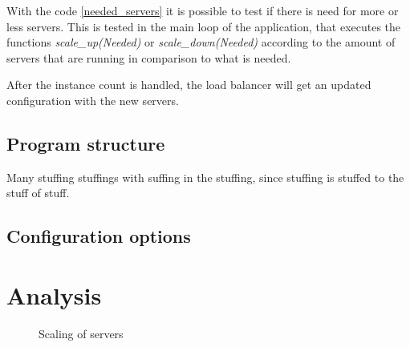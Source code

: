 With the code \ref{needed_servers} it is possible to test if there is need for
more or less servers. This is tested in the main loop of the application, that
executes the functions \textit{scale\_up(Needed)} or
\textit{scale\_down(Needed)} according to the amount of
servers that are running in comparison to what is needed.

After the instance count is handled, the load balancer will get an updated
configuration with the new servers.


\subsection{Program structure}
\begin{minipage}[t]{0.7\textwidth}
Many stuffing stuffings with suffing in the stuffing, since stuffing is stuffed
to the stuff of stuff.
\end{minipage}
\begin{minipage}[t]{0.3\textwidth}
\end{minipage}

\subsection{Configuration options}

\section{Analysis}
\begin{figure}[htp]
\centering
{}
\caption{\label{fig:server_scaling}Scaling of servers}
\end{figure}


